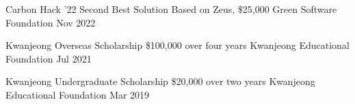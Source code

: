 



\begin{cvhonors}

  \cvhonor
    {Carbon Hack '22 Second Best Solution} %
    {Based on Zeus, \$25,000} %
    {Green Software Foundation} %
    {Nov 2022} %

  \cvhonor
    {Kwanjeong Overseas Scholarship} %
    {\$100,000 over four years} %
    {Kwanjeong Educational Foundation} %
    {Jul 2021} %

  \cvhonor
    {Kwanjeong Undergraduate Scholarship} %
    {\$20,000 over two years} %
    {Kwanjeong Educational Foundation} %
    {Mar 2019} %




\end{cvhonors}




